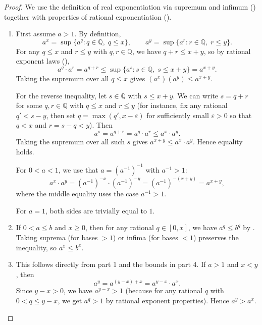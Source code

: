 \begin{proof}
We use the definition of real exponentiation via supremum and infimum () together with properties of rational exponentiation ().

\begin{enumerate}
    \item First assume $a > 1$. By definition,
    $$a^x = \sup\{a^q : q \in \mathbb{Q},\; q \leq x\}, \qquad a^y = \sup\{a^r : r \in \mathbb{Q},\; r \leq y\}.$$
    For any $q \leq x$ and $r \leq y$ with $q,r \in \mathbb{Q}$, we have $q+r \leq x+y$, so by rational exponent laws (),
    $$a^q \cdot a^r = a^{q+r} \leq \sup\{a^s : s \in \mathbb{Q},\; s \leq x+y\} = a^{x+y}.$$
    Taking the supremum over all $q \leq x$ gives $(a^x)(a^y) \leq a^{x+y}$.

    For the reverse inequality, let $s \in \mathbb{Q}$ with $s \leq x+y$. We can write $s = q+r$ for some $q,r \in \mathbb{Q}$ with $q \leq x$ and $r \leq y$ (for instance, fix any rational $q' < s-y$, then set $q = \max(q',x-\varepsilon)$ for sufficiently small $\varepsilon > 0$ so that $q < x$ and $r = s-q < y$). Then
    $$a^s = a^{q+r} = a^q \cdot a^r \leq a^x \cdot a^y.$$
    Taking the supremum over all such $s$ gives $a^{x+y} \leq a^x \cdot a^y$. Hence equality holds.

    For $0 < a < 1$, we use that $a = (a^{-1})^{-1}$ with $a^{-1} > 1$:
    $$a^x \cdot a^y = (a^{-1})^{-x} \cdot (a^{-1})^{-y} = (a^{-1})^{-(x+y)} = a^{x+y},$$
    where the middle equality uses the case $a^{-1} > 1$.

    For $a = 1$, both sides are trivially equal to $1$.

    \item If $0 < a \leq b$ and $x \geq 0$, then for any rational $q \in [0,x]$, we have $a^q \leq b^q$ by . Taking suprema (for bases $>1$) or infima (for bases $<1$) preserves the inequality, so $a^x \leq b^x$.

    \item This follows directly from part 1 and the bounds in part 4. If $a > 1$ and $x < y$, then
    $$a^y = a^{(y-x)+x} = a^{y-x} \cdot a^x.$$
    Since $y-x > 0$, we have $a^{y-x} > 1$ (because for any rational $q$ with $0 < q \leq y-x$, we get $a^q > 1$ by rational exponent properties). Hence $a^y > a^x$.


\end{enumerate}
\end{proof}
